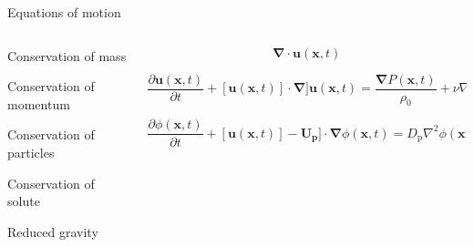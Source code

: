 \documentclass[final]{beamer} %
\begin{document}
\begin{frame}[t]
\begin{columns}[t]
\begin{column}{0.6\paperwidth}
\begin{columns}[t]
\begin{column}{0.3\paperwidth}
        \end{column}
      \end{columns}

      \begin{columns}[t]
        \begin{column}{0.43\paperwidth}

          \begin{block}{Equations of motion}

            \begin{columns}[t]

              \begin{column}{0.13\paperwidth}

                \centering

                Conservation of mass \\

                \vspace{1.75cm}

                Conservation of momentum \\

                \vspace{1.75cm}

                Conservation of particles \\

                \vspace{1.75cm}

                Conservation of solute \\

                \vspace{1.75cm}

                Reduced gravity 

              \end{column}

              \begin{column}{0.3\paperwidth}
                $$ \mathbf{\nabla} \cdot \mathbf{u}(\mathbf{x}, t) $$

                $$ \frac{\partial \mathbf{u}(\mathbf{x}, t)}{\partial t} +
                [\mathbf{u}(\mathbf{x}, t)] \cdot \mathbf{\nabla}]
                  \mathbf{u}(\mathbf{x}, t) =
                  \frac{\mathbf{\nabla} P(\mathbf{x}, t)}{\rho_{0}} +
                  \nu \nabla^{2} \mathbf{u}(\mathbf{x}, t) - g'\mathbf{\hat{z}} $$

                  $$ \frac{\partial \phi(\mathbf{x}, t)}{\partial t} +
                  [\mathbf{u}(\mathbf{x}, t)] - \mathbf{U_{\text{p}}}] \cdot
                    \mathbf{\nabla} \phi(\mathbf{x}, t) =
                    D_{\text{p}} \nabla^{2} \phi(\mathbf{x}, t) $$
                    

\end{column}
\end{columns}
\end{block}
\end{column}
\end{columns}
\end{column}
\end{columns}
\end{frame}
\end{document}
